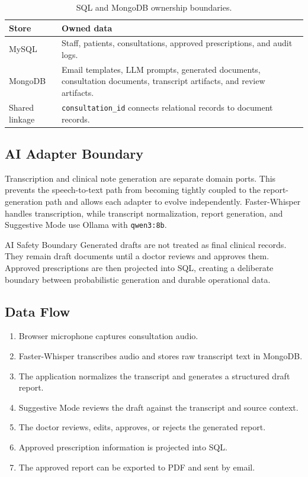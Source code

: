 \begin{table}[h]
\centering
\begin{tabularx}{\textwidth}{@{}L{0.25\textwidth}Y@{}}
\toprule
\textbf{Store} & \textbf{Owned data} \\
\midrule
MySQL & Staff, patients, consultations, approved prescriptions, and audit logs. \\
MongoDB & Email templates, LLM prompts, generated documents, consultation documents, transcript artifacts, and review artifacts. \\
Shared linkage & \texttt{consultation\_id} connects relational records to document records. \\
\bottomrule
\end{tabularx}
\caption{SQL and MongoDB ownership boundaries.}
\end{table}

\subsection{AI Adapter Boundary}

Transcription and clinical note generation are separate domain ports. This prevents the speech-to-text path from becoming tightly coupled to the report-generation path and allows each adapter to evolve independently. Faster-Whisper handles transcription, while transcript normalization, report generation, and Suggestive Mode use Ollama with \texttt{qwen3:8b}.

\begin{calloutbox}{AI Safety Boundary}
Generated drafts are not treated as final clinical records. They remain draft documents until a doctor reviews and approves them. Approved prescriptions are then projected into SQL, creating a deliberate boundary between probabilistic generation and durable operational data.
\end{calloutbox}

\subsection{Data Flow}

\begin{enumerate}
  \item Browser microphone captures consultation audio.
  \item Faster-Whisper transcribes audio and stores raw transcript text in MongoDB.
  \item The application normalizes the transcript and generates a structured draft report.
  \item Suggestive Mode reviews the draft against the transcript and source context.
  \item The doctor reviews, edits, approves, or rejects the generated report.
  \item Approved prescription information is projected into SQL.
  \item The approved report can be exported to PDF and sent by email.
\end{enumerate}